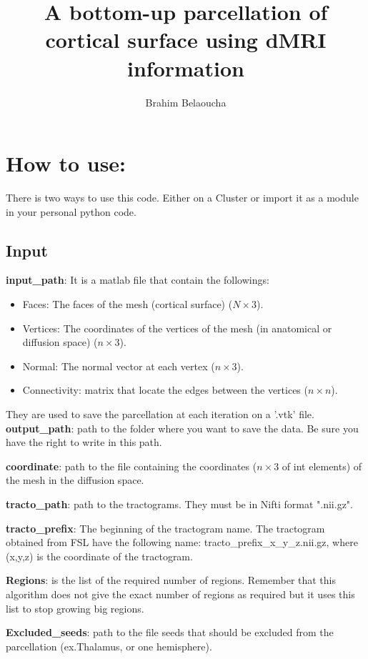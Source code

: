 \documentclass[a4paper,10pt]{article}
\title{A bottom-up parcellation of cortical surface using dMRI information}
\author{Brahim Belaoucha}
\begin{document}
\maketitle

\section{How to use:}
There is two ways to use this code. Either on a Cluster or import it as a module in your personal python code.
\subsection{Input}
\noindent \textbf{input\_path}: It is a matlab file that contain the followings:
\begin{itemize}
 \item Faces: The faces of the mesh (cortical surface) ($N\times 3$).
 \item Vertices: The coordinates of the vertices of the mesh (in anatomical or diffusion space) ($n\times 3$).
 \item Normal: The normal vector at each vertex ($n\times 3$).
 \item Connectivity: matrix that locate the edges between the vertices ($n\times n$).
\end{itemize}
They are used to save the parcellation at each iteration on a '.vtk' file.
\noindent \textbf{output\_path}: path to the folder where you want to save the data. Be sure you have the right to write in this path.

\noindent \textbf{coordinate}: path to the file containing the coordinates ($n\times 3$ of int elements) of the mesh in the diffusion space. 

\noindent \textbf{tracto\_path}: path to the tractograms. They must be in Nifti format ".nii.gz".

\noindent \textbf{tracto\_prefix}: The beginning of the tractogram name. The tractogram obtained from FSL have the following name: tracto\_prefix\_x\_y\_z.nii.gz, where 
(x,y,z) is the coordinate of the tractogram.

\noindent \textbf{Regions}: is the list of the required number of regions. Remember that this algorithm does not give the exact number of regions as required but it uses
this list to stop growing big regions.

\noindent \textbf{Excluded\_seeds}: path to the file seeds that should be excluded from the parcellation (ex.Thalamus, or one hemisphere).  
\end{document}
